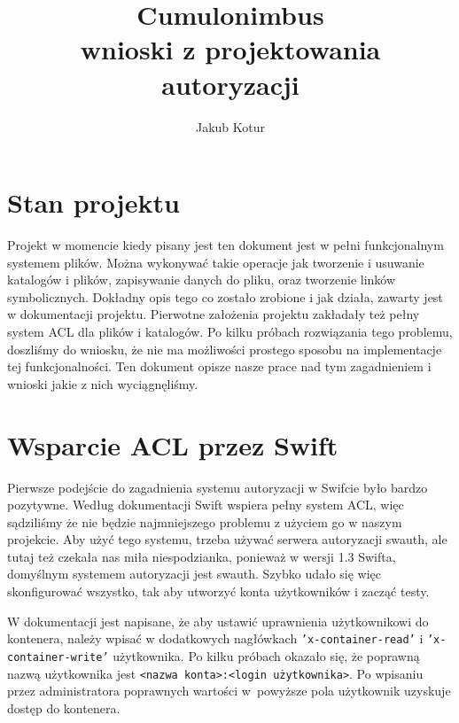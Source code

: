 

\usepackage{microtype}


\title{Cumulonimbus\\\large{wnioski z projektowania autoryzacji}}
\author{Jakub Kotur}


	\maketitle

	\section{Stan projektu}\label{sec:stan projektu}

	Projekt w momencie kiedy pisany jest ten dokument jest w pełni funkcjonalnym systemem plików. Można wykonywać takie operacje jak tworzenie i usuwanie katalogów i plików, zapisywanie danych do pliku, oraz tworzenie linków symbolicznych. Dokładny opis tego co zostało zrobione i jak działa, zawarty jest w dokumentacji projektu. Pierwotne założenia projektu zakładały też pełny system ACL dla plików i katalogów. Po kilku próbach rozwiązania tego problemu, doszliśmy do wniosku, że nie ma możliwości prostego sposobu na implementacje tej funkcjonalności. Ten dokument opisze nasze prace nad tym zagadnieniem i wnioski jakie z nich wyciągnęliśmy.
	
	\section{Wsparcie ACL przez Swift}\label{sec:wsparcie acl przez swift}

	Pierwsze podejście do zagadnienia systemu autoryzacji w Swifcie było bardzo pozytywne. Według dokumentacji Swift wspiera pełny system ACL, więc sądziliśmy że nie będzie najmniejszego problemu z użyciem go w naszym projekcie. Aby użyć tego systemu, trzeba używać serwera autoryzacji swauth, ale tutaj też czekała nas miła niespodzianka, ponieważ w wersji 1.3 Swifta, domyślnym systemem autoryzacji jest swauth. Szybko udało się więc skonfigurować wszystko, tak aby utworzyć konta użytkowników i zacząć testy.

	W dokumentacji jest napisane, że aby ustawić uprawnienia użytkownikowi do kontenera, należy wpisać w dodatkowych nagłówkach \texttt{'x-container-read'} i \texttt{'x-container-write'} użytkownika. Po kilku próbach okazało się, że poprawną nazwą użytkownika jest \texttt{<nazwa konta>:<login użytkownika>}. Po wpisaniu przez administratora poprawnych wartości w~powyższe pola użytkownik uzyskuje dostęp do kontenera.

